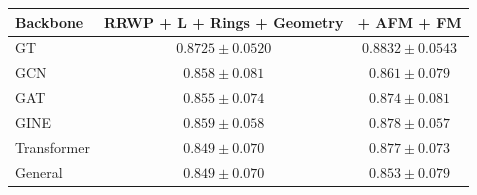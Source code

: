 \begin{tabular}{l c c}
\toprule
Backbone & RRWP + L + Rings + Geometry & + AFM + FM \\
\midrule
GT & $0.8725 \pm 0.0520$ & $0.8832 \pm 0.0543$ \\
GCN & $0.858 \pm 0.081$ & $0.861 \pm 0.079$ \\
GAT & $0.855 \pm 0.074$ & $0.874 \pm 0.081$ \\
GINE & $0.859 \pm 0.058$ & $0.878 \pm 0.057$ \\
Transformer & $0.849 \pm 0.070$ & $0.877 \pm 0.073$ \\
General & $0.849 \pm 0.070$ & $0.853 \pm 0.079$ \\
\bottomrule
\end{tabular}
